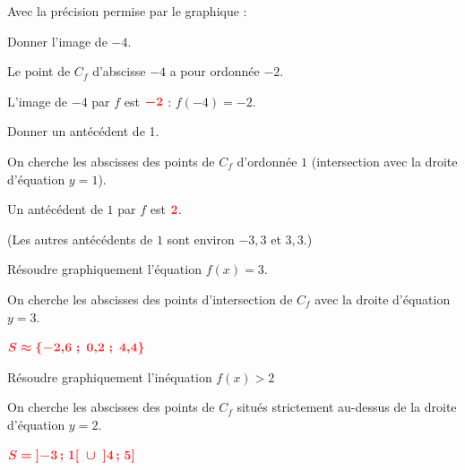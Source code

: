 \documentclass[11pt,a4paper]{article}  %
\begin{document}
	Avec la précision permise par le graphique :
	\begin{enumMet}
		\item Donner l'image de $-4$. \quad {}
		
		\begin{corrBox}
			Le point de $C_f$ d'abscisse $-4$ a pour ordonnée $-2$.
			
			L'image de $-4$ par $f$ est $\mRouge{-2}$ : $f(-4)=-2$.
		\end{corrBox}
		
		\item Donner un antécédent de 1. \quad {}
		
		\begin{corrBox}
			On cherche les abscisses des points de $C_f$ d'ordonnée $1$ (intersection avec la droite d'équation $y=1$).
			
			Un antécédent de $1$ par $f$ est $\mRouge{2}$.
			
			(Les autres antécédents de $1$ sont environ $-3{,}3$ et $3{,}3$.)
		\end{corrBox}
		
		\item {} Résoudre graphiquement l'équation $f(x)=3$. \quad {}
		
		\begin{corrBox}
			On cherche les abscisses des points d'intersection de $C_f$ avec la droite d'équation $y=3$.
			
			$\mRouge{S\approx\left\{-2{,}6\ ;\ 0{,}2\ ;\ 4{,}4\right\}}$
		\end{corrBox}
		
		\item Résoudre graphiquement l'inéquation $f(x)> 2$ \quad {}
		
		\begin{corrBox}
			On cherche les abscisses des points de $C_f$ situés strictement au-dessus de la droite d'équation $y=2$.
			
			$\mRouge{S=\left]-3\,;\,1\right[\ \cup\ \left]4\,;\,5\right]}$
		\end{corrBox}
	\end{enumMet}
	
\end{document}
